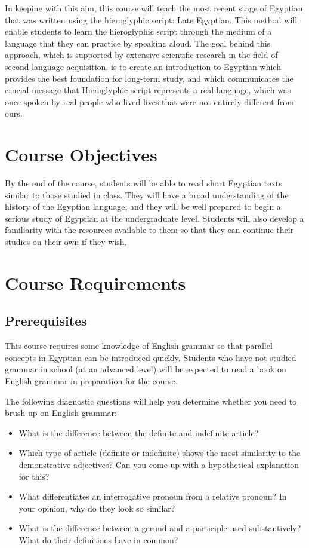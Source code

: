 \documentclass[11pt]{article}
\begin{document}
		In keeping with this aim, this course will teach the most recent stage of Egyptian that was written using the hieroglyphic script: Late Egyptian. This method will enable students to learn the hieroglyphic script through the medium of a language that they can practice by speaking aloud. The goal behind this approach, which is supported by extensive scientific research in the field of second-language acquisition, is to create an introduction to Egyptian which provides the best foundation for long-term study, and which communicates the crucial message that Hieroglyphic script represents a real language, which was once spoken by real people who lived lives that were not entirely different from ours. 
			
		
		
	\section*{Course Objectives}
	
		By the end of the course, students will be able to read short Egyptian texts similar to those studied in class. They will have a broad understanding of the history of the Egyptian language, and they will be well prepared to begin a serious study of Egyptian at the undergraduate level. Students will also develop a familiarity with the resources available to them so that they can continue their studies on their own if they wish.
	
	
	\section*{Course Requirements}
	
	\subsection*{Prerequisites}
		
		This course requires some knowledge of English grammar so that parallel concepts in Egyptian can be introduced quickly. 
		Students who have not studied grammar in school (at an advanced level) will be expected to read a book on English grammar in preparation for the course.
		
		
		The following diagnostic questions will help you determine whether you need to brush up on English grammar:
		\begin{itemize}
			\item What is the difference between the definite and indefinite article?
			\item Which type of article (definite or indefinite) shows the most similarity to the demonstrative adjectives? Can you come up with a hypothetical explanation for this?
			\item What differentiates an interrogative pronoun from a relative pronoun? In your opinion, why do they look so similar?
			\item What is the difference between a gerund and a participle used substantively? What do their definitions have in common?
		\end{itemize}
		
\end{document}
